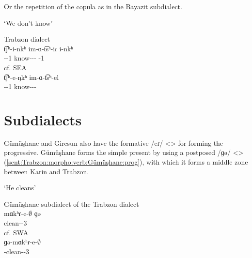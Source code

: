 Or the repetition of the copula as in the Bayazit subdialect. 



\begin{exe}
	
	\ex `We don't know' \label{sent:Trabzon:morpho:verb:negRepetCop}
	\begin{xlist}
		\ex Trabzon dialect  \\
		\gll t͡ʃʰ-i-nkʰ im-ɑ-t͡sʰ-iɾ i-nkʰ\\
		{\neggloss}-{\aux}-1{\pl} know-{\lvgloss}-{\aor}-{\perfcvb} {\aux}-1{\pl} \\
		\trans {}
		\ex cf. SEA \\
		\gll t͡ʃʰ-e-ŋkʰ im-ɑ-t͡sʰ-el \\
		{\neggloss}-{\aux}-1{\pl} know-{\lvgloss}-{\aor}-{\perfcvb} \\
		\trans {}
	\end{xlist}
	
\end{exe}

\section{Subdialects}
Gümüşhane and Giresun also have the formative /eɾ/ <> for forming the progressive. Gümüşhane forms the simple present by using a postposed /ɡə/ <> (\ref{sent:Trabzon:morpho:verb:Gümüşhane:prog}), with which it forms a middle zone between Karin and Trabzon. 


\begin{exe}
	
	\ex `He cleans' \label{sent:Trabzon:morpho:verb:Gümüşhane:prog}
	\begin{xlist}
		\ex Gümüşhane subdialect of the Trabzon dialect  \\
		\gll mɑkʰɾ-e-$\emptyset$ ɡə\\
		clean-{\thgloss}-3{\sg} {\ind} \\
		\trans \armenian{մաքրէ գը}
		\ex cf. SWA 
		\\
		ɡə-mɑkʰɾ-e-$\emptyset$ \\
		{\ind}-clean-{\thgloss}-3{\sg}\\
		\armenian{կը մաքրէ}
	\end{xlist}
\end{exe}



